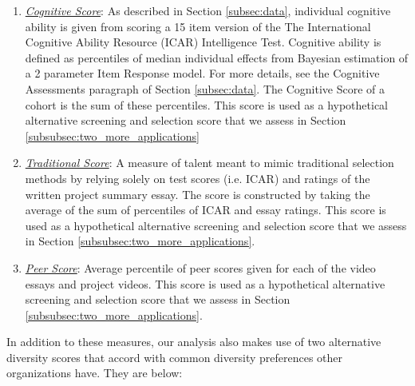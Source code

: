 \begin{enumerate}
\item \underline{\emph{Cognitive Score}}: As described in Section \ref{subsec:data}, individual cognitive ability is given from scoring a 15 item version of the The International Cognitive Ability Resource (ICAR) Intelligence Test. Cognitive ability is defined as percentiles of median individual effects from Bayesian estimation of a 2 parameter Item Response model. For more details, see the Cognitive Assessments paragraph of Section \ref{subsec:data}. The Cognitive Score of a cohort is the sum of these percentiles. This score is used as a hypothetical alternative screening and selection score that we assess in Section \ref{subsubsec:two_more_applications}
\item \underline{\emph{Traditional Score}}: A measure of talent meant to mimic traditional selection methods by relying solely on test scores (i.e. ICAR) and ratings of the written project summary essay. The score is constructed by taking the average of the sum of percentiles of ICAR and essay ratings. This score is used as a hypothetical alternative screening and selection score that we assess in Section \ref{subsubsec:two_more_applications}.
\item \underline{\emph{Peer Score}}: Average percentile of peer scores given for each of the video essays and project videos. This score is used as a hypothetical alternative screening and selection score that we assess in Section \ref{subsubsec:two_more_applications}.
\end{enumerate}

In addition to these measures, our analysis also makes use of two alternative diversity scores that accord with common diversity preferences other organizations have. They are below:

